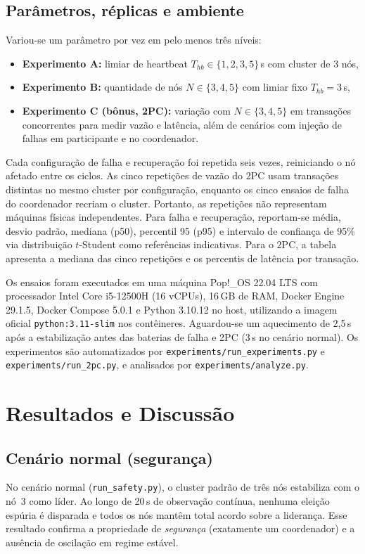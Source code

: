 \documentclass[journal]{IEEEtran}
\begin{document}
\subsection{Parâmetros, réplicas e ambiente}
Variou-se um parâmetro por vez em pelo menos três níveis:
\begin{itemize}
    \item \textbf{Experimento A:} limiar de heartbeat $T_{hb} \in \{1, 2, 3, 5\}$\,s com cluster de 3 nós,
    \item \textbf{Experimento B:} quantidade de nós $N \in \{3, 4, 5\}$ com limiar fixo $T_{hb}=3$\,s,
    \item \textbf{Experimento C (bônus, 2PC):} variação com $N \in \{3, 4, 5\}$ em transações concorrentes para medir vazão e latência, além de cenários com injeção de falhas em participante e no coordenador.
\end{itemize}
Cada configuração de falha e recuperação foi repetida seis vezes, reiniciando o nó afetado entre os ciclos. As cinco repetições de vazão do 2PC usam transações distintas no mesmo cluster por configuração, enquanto os cinco ensaios de falha do coordenador recriam o cluster. Portanto, as repetições não representam máquinas físicas independentes. Para falha e recuperação, reportam-se média, desvio padrão, mediana (p50), percentil 95 (p95) e intervalo de confiança de 95\% via distribuição $t$-Student como referências indicativas. Para o 2PC, a tabela apresenta a mediana das cinco repetições e os percentis de latência por transação. 

Os ensaios foram executados em uma máquina Pop!\_OS 22.04 LTS com processador Intel Core i5-12500H (16 vCPUs), 16\,GB de RAM, Docker Engine 29.1.5, Docker Compose 5.0.1 e Python 3.10.12 no host, utilizando a imagem oficial \texttt{python:3.11-slim} nos contêineres. Aguardou-se um aquecimento de 2,5\,s após a estabilização antes das baterias de falha e 2PC (3\,s no cenário normal). Os experimentos são automatizados por \texttt{experiments/run\_experiments.py} e \texttt{experiments/run\_2pc.py}, e analisados por \texttt{experiments/analyze.py}.

\section{Resultados e Discussão}
\subsection{Cenário normal (segurança)}
No cenário normal (\texttt{run\_safety.py}), o cluster padrão de três nós estabiliza com o nó~3 como líder. Ao longo de 20\,s de observação contínua, nenhuma eleição espúria é disparada e todos os nós mantêm total acordo sobre a liderança. Esse resultado confirma a propriedade de \emph{segurança} (exatamente um coordenador) e a ausência de oscilação em regime estável.
\end{document}
